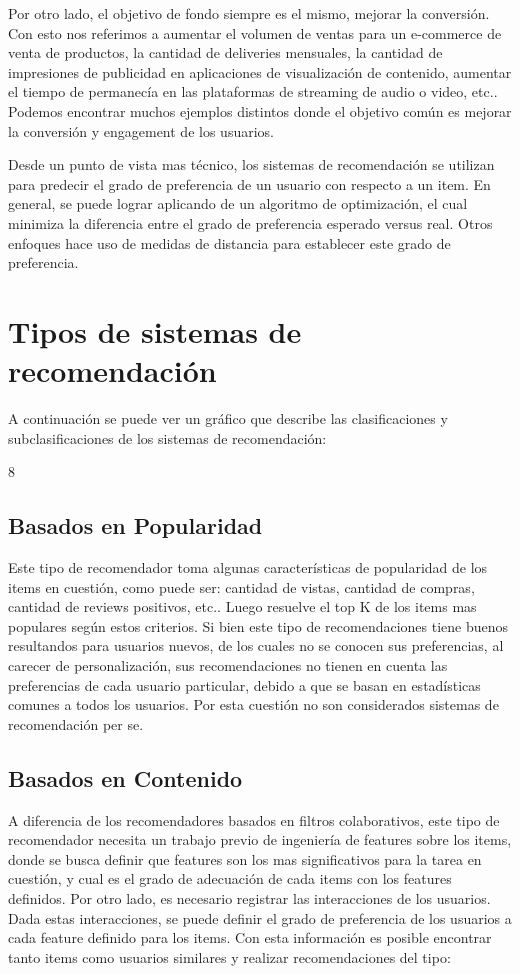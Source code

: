 \documentclass[11pt,a4paper,twoside]{thesis}
\begin{document}
Por otro lado, el objetivo de fondo siempre es el mismo, mejorar la conversión. Con esto nos referimos a aumentar el volumen de ventas para un e-commerce de venta de productos, la cantidad de deliveries mensuales, la cantidad de impresiones de publicidad  en aplicaciones de visualización de contenido, aumentar el tiempo de permanecía en las plataformas de streaming de audio o video, etc.. Podemos encontrar muchos ejemplos distintos donde el objetivo común es mejorar la conversión y engagement de los usuarios.

Desde un punto de vista mas técnico, los sistemas de recomendación se utilizan para predecir el grado de preferencia de un usuario con respecto a un item. 
En general, se puede lograr aplicando de un algoritmo de optimización, el cual minimiza la diferencia entre el grado de preferencia esperado versus real. Otros enfoques hace uso de medidas de distancia para establecer este grado de preferencia.

\clearpage
\section{Tipos de sistemas de recomendación}

A continuación se puede ver un gráfico que describe las clasificaciones y subclasificaciones de los sistemas de recomendación:

8
\subsection{Basados en Popularidad} 

Este tipo de recomendador toma algunas características de popularidad de los items en cuestión, como puede ser: cantidad de vistas, cantidad de compras, cantidad de reviews positivos, etc.. Luego resuelve el top K de  los items mas populares según estos criterios. Si bien este tipo de recomendaciones tiene buenos resultandos para usuarios nuevos, de los cuales no se conocen sus preferencias, al carecer de personalización, sus recomendaciones no tienen en cuenta las preferencias de cada usuario particular, debido a que se basan en estadísticas comunes a todos los usuarios. Por esta cuestión no son considerados sistemas de recomendación per se.

\subsection{Basados en Contenido} 

A diferencia de los recomendadores basados en filtros colaborativos, este tipo de recomendador necesita un trabajo previo de ingeniería de features sobre los items, donde se busca definir que features son los mas significativos para la tarea en cuestión, y cual es el grado de adecuación de cada items con los features definidos. Por otro lado, es necesario registrar las interacciones de los usuarios. Dada estas interacciones, se puede definir el grado de preferencia de los usuarios a cada feature definido para los items. Con esta información es posible encontrar tanto items como usuarios similares y realizar recomendaciones del tipo:
\end{document}
